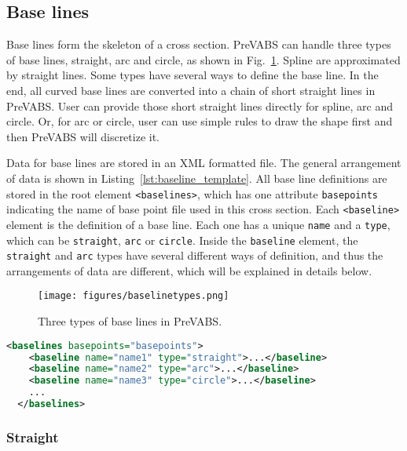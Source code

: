 \documentclass{book}
\begin{document}
\subsection{Base lines}

Base lines form the skeleton of a cross section. PreVABS can handle three 
types of base lines, straight, arc and circle, as shown in Fig.~\ref{fig:baselinetypes}. 
Spline are approximated by straight lines. Some types have several ways 
to define the base line. In the end, all curved base lines are converted 
into a chain of short straight lines in PreVABS. User can provide those 
short straight lines directly for spline, arc and circle. Or, for arc 
or circle, user can use simple rules to draw the shape first and then 
PreVABS will discretize it.

Data for base lines are stored in an XML formatted file. The general 
arrangement of data is shown in Listing~\ref{lst:baseline_template}. 
All base line definitions are stored in the root element \lstinline{<baselines>}, 
which has one attribute \lstinline{basepoints} indicating the name of 
base point file used in this cross section. Each \lstinline{<baseline>} 
element is the definition of a base line. Each one has a unique \lstinline{name} 
and a \lstinline{type}, which can be \lstinline{straight}, \lstinline{arc} 
or \lstinline{circle}. Inside the \lstinline{baseline} element, the 
\lstinline{straight} and \lstinline{arc} types have several different 
ways of definition, and thus the arrangements of data are different, 
which will be explained in details below.

\begin{figure}
  \centerline{\texttt{[image: figures/baselinetypes.png]}}
  \caption{Three types of base lines in PreVABS.}
  \label{fig:baselinetypes}
\end{figure}

\begin{lstlisting}[language=xml,caption={Base line input file template},label={lst:baseline_template}]
  <baselines basepoints="basepoints">
    <baseline name="name1" type="straight">...</baseline>
    <baseline name="name2" type="arc">...</baseline>
    <baseline name="name3" type="circle">...</baseline>
    ...
  </baselines>
\end{lstlisting}

\subsubsection{Straight}
\end{document}
